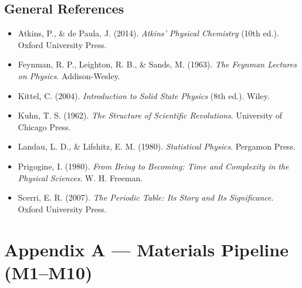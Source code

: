 \documentclass[11pt, letterpaper, openany]{book}
\begin{document}
\section*{General References}

\begin{itemize}

    \item Atkins, P., \& de Paula, J. (2014). \textit{Atkins' Physical Chemistry} (10th ed.). Oxford University Press.

    \item Feynman, R. P., Leighton, R. B., \& Sands, M. (1963). \textit{The Feynman Lectures on Physics}. Addison-Wesley.

    \item Kittel, C. (2004). \textit{Introduction to Solid State Physics} (8th ed.). Wiley.

    \item Kuhn, T. S. (1962). \textit{The Structure of Scientific Revolutions}. University of Chicago Press.

    \item Landau, L. D., \& Lifshitz, E. M. (1980). \textit{Statistical Physics}. Pergamon Press.

    \item Prigogine, I. (1980). \textit{From Being to Becoming: Time and Complexity in the Physical Sciences}. W. H. Freeman.

    \item Scerri, E. R. (2007). \textit{The Periodic Table: Its Story and Its Significance}. Oxford University Press.

\end{itemize}



\chapter*{Appendix A — Materials Pipeline (M1–M10)}
\end{document}

